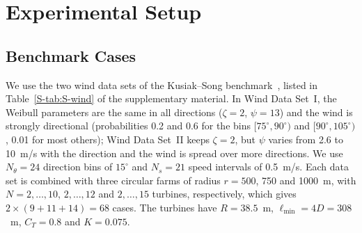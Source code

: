 \documentclass[journal,twoside]{IEEEtran}
\begin{document}
\section{Experimental Setup}
\label{sec:setup}

\subsection{Benchmark Cases}
We use the two wind data sets of the Kusiak--Song benchmark~\cite{Kusiak2010,Bansal2017}, listed in Table~\ref{S-tab:S-wind} of the supplementary material. In Wind Data Set~I, the Weibull parameters are the same in all directions ($\zeta=2$, $\psi=13$) and the wind is strongly directional (probabilities 0.2 and 0.6 for the bins $[75^\circ,90^\circ)$ and $[90^\circ,105^\circ)$, 0.01 for most others); Wind Data Set~II keeps $\zeta=2$, but $\psi$ varies from 2.6 to 10~m/s with the direction and the wind is spread over more directions. We use $N_\theta=24$ direction bins of $15^\circ$ and $N_s=21$ speed intervals of 0.5~m/s. Each data set is combined with three circular farms of radius $r=500$, 750 and 1000~m, with $N=2,\ldots,10$, $2,\ldots,12$ and $2,\ldots,15$ turbines, respectively, which gives $2\times(9+11+14)=68$ cases. The turbines have $R=38.5$~m, $\ell_{\min}=4D=308$~m, $C_T=0.8$ and $K=0.075$.
\end{document}
